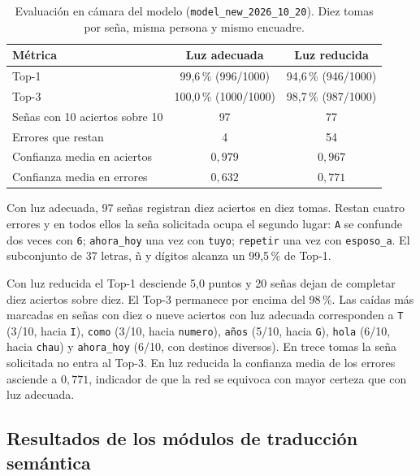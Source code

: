 \begin{table}[H]
    \centering
    \small
    \caption{Evaluación en cámara del modelo (\texttt{model\_new\_2026\_10\_20}). Diez tomas por seña, misma persona y mismo encuadre.}
    \label{tab:eval_100_luz}
    \begin{tabular}{lcc}
        \toprule
        \textbf{Métrica} & \textbf{Luz adecuada} & \textbf{Luz reducida} \\
        \midrule
        Top-1 & 99{,}6\,\% (996/1000) & 94{,}6\,\% (946/1000) \\
        Top-3 & 100{,}0\,\% (1000/1000) & 98{,}7\,\% (987/1000) \\
        Señas con 10 aciertos sobre 10 & 97 & 77 \\
        Errores que restan & 4 & 54 \\
        Confianza media en aciertos & $0{,}979$ & $0{,}967$ \\
        Confianza media en errores & $0{,}632$ & $0{,}771$ \\
        \bottomrule
    \end{tabular}
\end{table}

Con luz adecuada, 97 señas registran diez aciertos en diez tomas. Restan cuatro errores y en todos ellos la seña solicitada ocupa el segundo lugar: \texttt{A} se confunde dos veces con \texttt{6}; \texttt{ahora\_hoy} una vez con \texttt{tuyo}; \texttt{repetir} una vez con \texttt{esposo\_a}. El subconjunto de 37 letras, ñ y dígitos alcanza un 99{,}5\,\% de Top-1.

Con luz reducida el Top-1 desciende 5,0 puntos y 20 señas dejan de completar diez aciertos sobre diez. El Top-3 permanece por encima del 98\,\%. Las caídas más marcadas en señas con diez o nueve aciertos con luz adecuada corresponden a \texttt{T} (3/10, hacia \texttt{I}), \texttt{como} (3/10, hacia \texttt{numero}), \texttt{años} (5/10, hacia \texttt{G}), \texttt{hola} (6/10, hacia \texttt{chau}) y \texttt{ahora\_hoy} (6/10, con destinos diversos). En trece tomas la seña solicitada no entra al Top-3. En luz reducida la confianza media de los errores asciende a $0{,}771$, indicador de que la red se equivoca con mayor certeza que con luz adecuada.

\subsection{Resultados de los módulos de traducción semántica}
\label{sec:res_traduccion}
\label{sec:eval_semantica_cuant}


